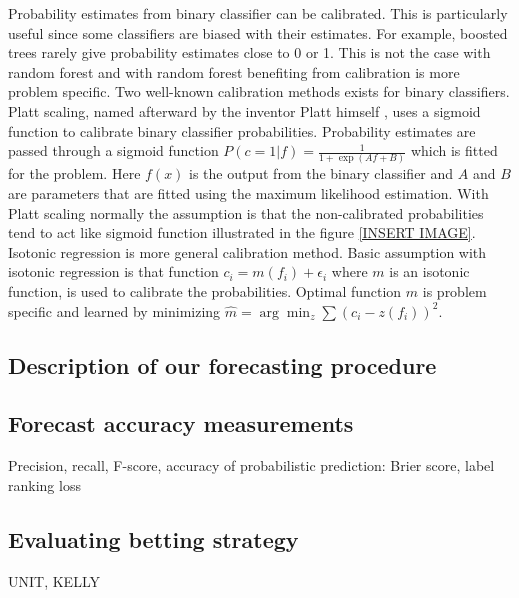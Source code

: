 Probability estimates from binary classifier can be calibrated. This is particularly useful since some classifiers are biased with their estimates. For example, boosted trees rarely give probability estimates close to 0 or 1. This is not the case with random forest and with random forest benefiting from calibration is more problem specific. \cite{niculescu2005predicting} Two well-known calibration methods exists for binary classifiers. Platt scaling, named afterward by the inventor Platt himself \cite{platt1999probabilistic}, uses a sigmoid function to calibrate binary classifier probabilities. Probability estimates are passed through a sigmoid function $P ( c = 1 | f ) = \frac { 1 } { 1 + \exp ( A f + B ) }$ which is fitted for the problem. Here $f(x)$ is the output from the binary classifier and $A$ and $B$ are parameters that are fitted using the maximum likelihood estimation. With Platt scaling normally the assumption is that the non-calibrated probabilities tend to act like sigmoid function illustrated in the figure \ref{INSERT IMAGE}. Isotonic regression is more general calibration method. Basic assumption with isotonic regression is that function $c _ { i } = m \left( f _ { i } \right) + \epsilon _ { i }$ where $m$ is an isotonic function, is used to calibrate the probabilities. Optimal function $m$ is problem specific and learned by minimizing $\hat { m } = \arg \min _ { z } \sum \left( c _ { i } - z \left( f _ { i } \right) \right) ^ { 2 }$. \cite{zadrozny2002transforming}




\subsection{Description of our forecasting procedure}
\subsection{Forecast accuracy measurements}
Precision, recall, F-score, accuracy of probabilistic prediction: Brier score, label ranking loss
\subsection{Evaluating betting strategy}
UNIT, KELLY
